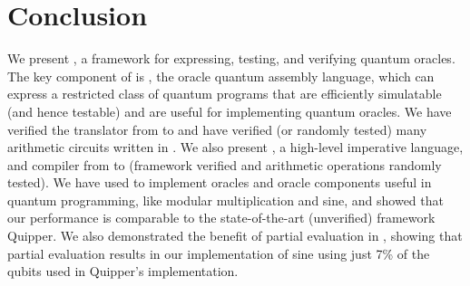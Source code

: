 \section{Conclusion}

We present \name, a framework for expressing, testing, and verifying quantum oracles. The key component of \name is \vqir, the oracle quantum assembly language, which can express a restricted class of quantum programs that are efficiently simulatable (and hence testable) and are useful for implementing quantum oracles. 
We have verified the translator from \vqir to \sqir and have verified (or randomly tested) many arithmetic circuits written in \vqir.
We also present \vqimp, a high-level imperative language, and compiler from \vqimp to \vqir (framework verified and arithmetic operations randomly tested). We have used \name to implement oracles and oracle components useful in quantum programming, like modular multiplication and sine, and showed that our performance is comparable to the state-of-the-art (unverified) framework Quipper. We also demonstrated the benefit of partial evaluation in \vqimp, showing that partial evaluation results in our implementation of sine using just 7\% of the qubits used in Quipper's implementation.

